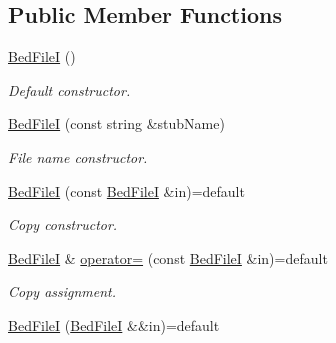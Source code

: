 \subsection*{Public Member Functions}
\begin{DoxyCompactItemize}
\item 
\mbox{\label{classsamp_files_1_1_bed_file_i_a8199fdbd94df701b0de0cbab46cddbed}} 
\hyperlink{classsamp_files_1_1_bed_file_i_a8199fdbd94df701b0de0cbab46cddbed}{Bed\+FileI} ()
\begin{DoxyCompactList}\small\item\em Default constructor. \end{DoxyCompactList}\item 
\hyperlink{classsamp_files_1_1_bed_file_i_abb33c9b143ab40ee37b56a62e7e999f8}{Bed\+FileI} (const string \&stub\+Name)
\begin{DoxyCompactList}\small\item\em File name constructor. \end{DoxyCompactList}\item 
\mbox{\label{classsamp_files_1_1_bed_file_i_ae7aaf5d849475010fd5f9d1154a18b34}} 
\hyperlink{classsamp_files_1_1_bed_file_i_ae7aaf5d849475010fd5f9d1154a18b34}{Bed\+FileI} (const \hyperlink{classsamp_files_1_1_bed_file_i}{Bed\+FileI} \&in)=default
\begin{DoxyCompactList}\small\item\em Copy constructor. \end{DoxyCompactList}\item 
\mbox{\label{classsamp_files_1_1_bed_file_i_a720c177b75980289a6eb9cfb2564ba2f}} 
\hyperlink{classsamp_files_1_1_bed_file_i}{Bed\+FileI} \& \hyperlink{classsamp_files_1_1_bed_file_i_a720c177b75980289a6eb9cfb2564ba2f}{operator=} (const \hyperlink{classsamp_files_1_1_bed_file_i}{Bed\+FileI} \&in)=default
\begin{DoxyCompactList}\small\item\em Copy assignment. \end{DoxyCompactList}\item 
\mbox{\label{classsamp_files_1_1_bed_file_i_ad22ff60c09b7fd0d64f5866451f2d861}} 
\hyperlink{classsamp_files_1_1_bed_file_i_ad22ff60c09b7fd0d64f5866451f2d861}{Bed\+FileI} (\hyperlink{classsamp_files_1_1_bed_file_i}{Bed\+FileI} \&\&in)=default

\end{DoxyCompactItemize}
